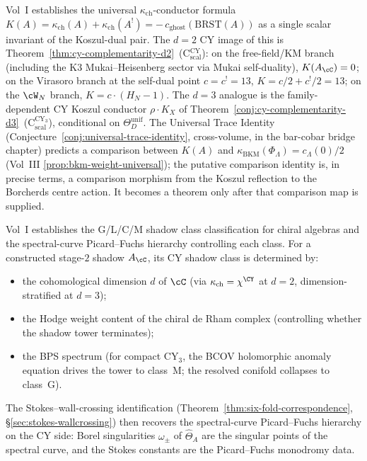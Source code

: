\begin{remark}
\label{rem:modular-koszul-bridge-universal-conductor}
Vol~I \cite{VolI} establishes the universal
$\kappa_{\mathrm{ch}}$-conductor formula
$K(A) = \kappa_{\mathrm{ch}}(A) + \kappa_{\mathrm{ch}}(A^!) =
-\,c_{\mathrm{ghost}}(\mathrm{BRST}(A))$ as a single scalar invariant of
the Koszul-dual pair. The $d = 2$ CY image of this is
Theorem~\ref{thm:cy-complementarity-d2}~(C$_{\mathrm{scal}}^{\mathrm{CY}}$): on the
free-field/KM branch \textup{(}including the K3 Mukai--Heisenberg sector via Mukai
self-duality\textup{)}, $K(A_\cC) = 0$; on the Virasoro branch at the
self-dual point $c = c^! = 13$, $K = c/2 + c^!/2 = 13$; on the $\cW_N$
branch, $K = c \cdot (H_N - 1)$. The $d = 3$ analogue is the
family-dependent CY Koszul conductor $\rho \cdot K_X$ of
Theorem~\ref{conj:cy-complementarity-d3}~(C$_{\mathrm{scal}}^{\mathrm{CY}_3}$),
conditional on $\Theta_D^{\mathrm{unif}}$. The Universal Trace Identity
\textup{(}Conjecture~\ref{conj:universal-trace-identity}\textup{,}
cross-volume, in the bar-cobar bridge chapter\textup{)} predicts a
comparison between $K(A)$ and
$\kappa_{\mathrm{BKM}}(\Phi_\Lambda) = c_\Lambda(0)/2$
\textup{(}Vol~III \ref{prop:bkm-weight-universal}\textup{)}; the
putative comparison identity
is, in precise terms, a comparison morphism from the Koszul reflection
to the Borcherds centre action.  It becomes a theorem only after that
comparison map is supplied.
\end{remark}

\begin{remark}
\label{rem:modular-koszul-bridge-quadrichotomy}
Vol~I \cite{VolI} establishes the G/L/C/M shadow class classification for chiral algebras and the spectral-curve Picard--Fuchs hierarchy controlling each class. For a constructed stage-$2$ shadow $A_\cC$, its CY shadow class is determined by:
\begin{itemize}
 \item the cohomological dimension $d$ of $\cC$ \textup{(}via $\kappa_{\mathrm{ch}} = \chi^{\CY}$ at $d = 2$, dimension-stratified at $d = 3$\textup{);}
 \item the Hodge weight content of the chiral de Rham complex \textup{(}controlling whether the shadow tower terminates\textup{);}
 \item the BPS spectrum \textup{(}for compact CY$_3$, the BCOV holomorphic anomaly equation drives the tower to class~M; the resolved conifold collapses to class~G\textup{).}
\end{itemize}
The Stokes--wall-crossing identification \textup{(}Theorem~\ref{thm:six-fold-correspondence}, \S\ref{sec:stokes-wallcrossing}\textup{)} then recovers the spectral-curve Picard--Fuchs hierarchy on the CY side: Borel singularities $\omega_\pm$ of $\hat\Theta_A$ are the singular points of the spectral curve, and the Stokes constants are the Picard--Fuchs monodromy data.
\end{remark}

